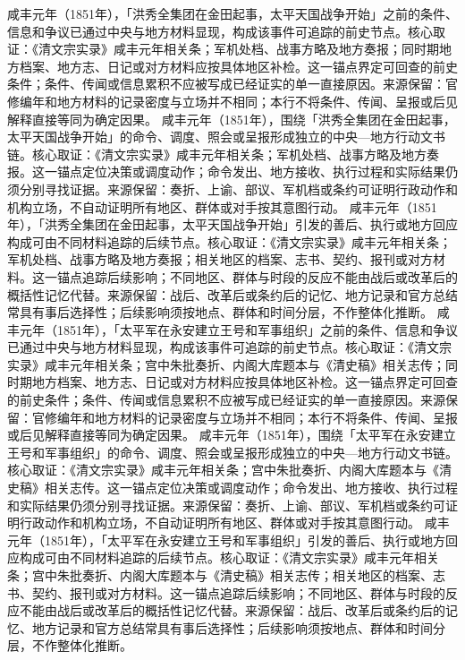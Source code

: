 咸丰元年（1851年），「洪秀全集团在金田起事，太平天国战争开始」之前的条件、信息和争议已通过中央与地方材料显现，构成该事件可追踪的前史节点。核心取证：《清文宗实录》咸丰元年相关条；军机处档、战事方略及地方奏报；同时期地方档案、地方志、日记或对方材料应按具体地区补检。这一锚点界定可回查的前史条件；条件、传闻或信息累积不应被写成已经证实的单一直接原因。来源保留：官修编年和地方材料的记录密度与立场并不相同；本行不将条件、传闻、呈报或后见解释直接等同为确定因果。
咸丰元年（1851年），围绕「洪秀全集团在金田起事，太平天国战争开始」的命令、调度、照会或呈报形成独立的中央—地方行动文书链。核心取证：《清文宗实录》咸丰元年相关条；军机处档、战事方略及地方奏报。这一锚点定位决策或调度动作；命令发出、地方接收、执行过程和实际结果仍须分别寻找证据。来源保留：奏折、上谕、部议、军机档或条约可证明行政动作和机构立场，不自动证明所有地区、群体或对手按其意图行动。
咸丰元年（1851年），「洪秀全集团在金田起事，太平天国战争开始」引发的善后、执行或地方回应构成可由不同材料追踪的后续节点。核心取证：《清文宗实录》咸丰元年相关条；军机处档、战事方略及地方奏报；相关地区的档案、志书、契约、报刊或对方材料。这一锚点追踪后续影响；不同地区、群体与时段的反应不能由战后或改革后的概括性记忆代替。来源保留：战后、改革后或条约后的记忆、地方记录和官方总结常具有事后选择性；后续影响须按地点、群体和时间分层，不作整体化推断。
咸丰元年（1851年），「太平军在永安建立王号和军事组织」之前的条件、信息和争议已通过中央与地方材料显现，构成该事件可追踪的前史节点。核心取证：《清文宗实录》咸丰元年相关条；宫中朱批奏折、内阁大库题本与《清史稿》相关志传；同时期地方档案、地方志、日记或对方材料应按具体地区补检。这一锚点界定可回查的前史条件；条件、传闻或信息累积不应被写成已经证实的单一直接原因。来源保留：官修编年和地方材料的记录密度与立场并不相同；本行不将条件、传闻、呈报或后见解释直接等同为确定因果。
咸丰元年（1851年），围绕「太平军在永安建立王号和军事组织」的命令、调度、照会或呈报形成独立的中央—地方行动文书链。核心取证：《清文宗实录》咸丰元年相关条；宫中朱批奏折、内阁大库题本与《清史稿》相关志传。这一锚点定位决策或调度动作；命令发出、地方接收、执行过程和实际结果仍须分别寻找证据。来源保留：奏折、上谕、部议、军机档或条约可证明行政动作和机构立场，不自动证明所有地区、群体或对手按其意图行动。
咸丰元年（1851年），「太平军在永安建立王号和军事组织」引发的善后、执行或地方回应构成可由不同材料追踪的后续节点。核心取证：《清文宗实录》咸丰元年相关条；宫中朱批奏折、内阁大库题本与《清史稿》相关志传；相关地区的档案、志书、契约、报刊或对方材料。这一锚点追踪后续影响；不同地区、群体与时段的反应不能由战后或改革后的概括性记忆代替。来源保留：战后、改革后或条约后的记忆、地方记录和官方总结常具有事后选择性；后续影响须按地点、群体和时间分层，不作整体化推断。
